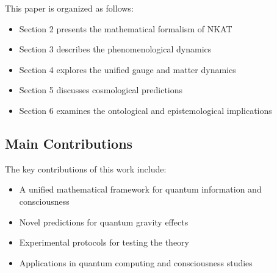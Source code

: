 This paper is organized as follows:

\begin{itemize}
    \item Section 2 presents the mathematical formalism of NKAT
    \item Section 3 describes the phenomenological dynamics
    \item Section 4 explores the unified gauge and matter dynamics
    \item Section 5 discusses cosmological predictions
    \item Section 6 examines the ontological and epistemological implications
\end{itemize}

\subsection{Main Contributions}

The key contributions of this work include:

\begin{itemize}
    \item A unified mathematical framework for quantum information and consciousness
    \item Novel predictions for quantum gravity effects
    \item Experimental protocols for testing the theory
    \item Applications in quantum computing and consciousness studies
\end{itemize} 
